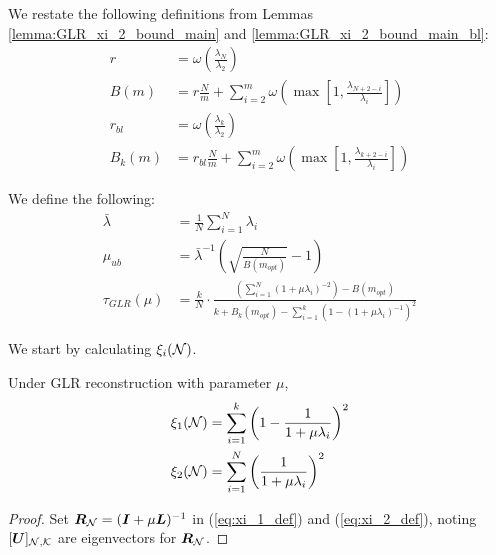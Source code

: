 We restate the following definitions from Lemmas \ref{lemma:GLR_xi_2_bound_main} and \ref{lemma:GLR_xi_2_bound_main_bl}:
\begin{align}
        r &= \omega\left( \frac{\lambda_{N}}{\lambda_{2}}\right) \\
        B(m) &= r \frac{N}{m} + \sum^{m}_{i=2}\omega\left(\max\left[1,\frac{\lambda_{N+2-i}}{\lambda_{i}}\right]\right) \\
        r_{bl} &= \omega\left( \frac{\lambda_{k}}{\lambda_{2}}\right) \\
        B_{k}(m) &= r_{bl} \frac{N}{m} + \sum^{m}_{i=2}\omega\left(\max\left[1,\frac{\lambda_{k+2-i}}{\lambda_{i}}\right]\right)
\end{align}


We define the following:
\begin{align}
    \bar{\lambda} &= \frac{1}{N}\sum_{i=1}^{N}\lambda_{i}\\
    \mu_{ub} &= \bar{\lambda}^{-1}\left(\sqrt{\frac{N}{B(m_{opt})}} -1\right)  \\
    \tau_{GLR}(\mu) &= \frac{k}{N} \cdot \frac{\left(\sum^{N}_{i=1}\left(1 + \mu\lambda_{i} \right)^{-2}\right) - B(m_{opt})}{k+B_{k}(m_{opt}) - \sum_{i=1}^{k} \left(1 - (1+\mu\lambda_{i})^{-1}\right)^{2}} 
\end{align}

We start by calculating $\xi_{i}(\mathcal{N})$.

\begin{lemma}
\label{lemma:GLR_full_observation_MSE}
  Under GLR reconstruction with parameter $\mu$,
    \begin{align}
        \xi_{1}(\mathcal{N}) &= \sum_{i=1}^{k} \left(1 - \frac{1}{1+\mu\lambda_{i}}\right)^{2} \\
         \xi_{2}(\mathcal{N}) &= \sum_{i=1}^{N} \left( \frac{1}{1+\mu\lambda_{i}}\right)^{2}
    \end{align}
\end{lemma}
\begin{proof}
    Set $\bm{R}_{\mathcal{N}}= (\bm{I} + \mu \bm{L})^{-1}$ in (\ref{eq:xi_1_def}) and (\ref{eq:xi_2_def}), noting $\matrsubU{N}$ are eigenvectors for $\bm{R}_{\mathcal{N}}$.
\end{proof}

